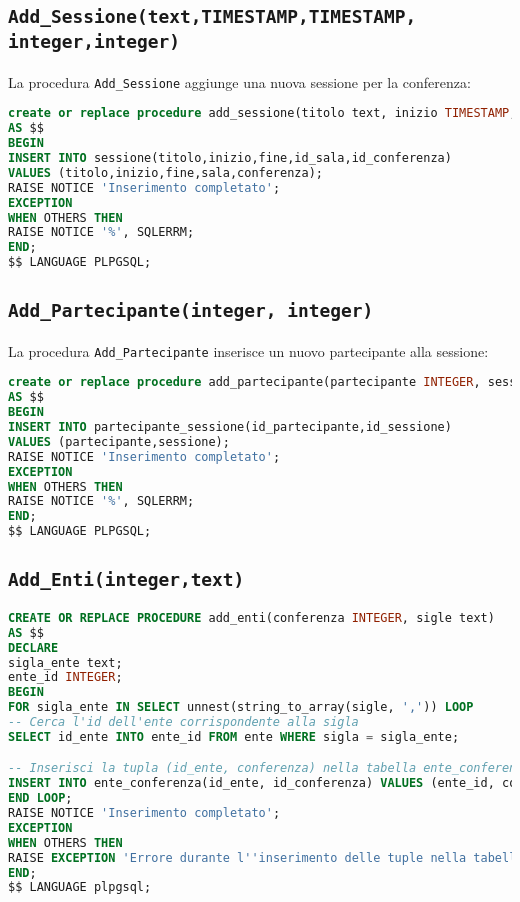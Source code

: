 \subsection{\texttt{Add\_Sessione(text,TIMESTAMP,TIMESTAMP, integer,integer)}}
La procedura \texttt{Add\_Sessione} aggiunge una nuova sessione per la conferenza:
\begin{lstlisting}[language=SQL, style=mystyle]
create or replace procedure add_sessione(titolo text, inizio TIMESTAMP, fine TIMESTAMP, sala INTEGER, conferenza INTEGER)
AS $$
BEGIN
INSERT INTO sessione(titolo,inizio,fine,id_sala,id_conferenza)
VALUES (titolo,inizio,fine,sala,conferenza);
RAISE NOTICE 'Inserimento completato';
EXCEPTION
WHEN OTHERS THEN
RAISE NOTICE '%', SQLERRM;
END;
$$ LANGUAGE PLPGSQL;
\end{lstlisting}
\subsection{\texttt{Add\_Partecipante(integer, integer)}}
La procedura \texttt{Add\_Partecipante} inserisce un nuovo partecipante alla sessione:
\begin{lstlisting}[language=SQL, style=mystyle]
create or replace procedure add_partecipante(partecipante INTEGER, sessione INTEGER)
AS $$
BEGIN
INSERT INTO partecipante_sessione(id_partecipante,id_sessione)
VALUES (partecipante,sessione);
RAISE NOTICE 'Inserimento completato';
EXCEPTION
WHEN OTHERS THEN
RAISE NOTICE '%', SQLERRM;
END;
$$ LANGUAGE PLPGSQL;
\end{lstlisting}
\subsection{\texttt{Add\_Enti(integer,text)}}
\begin{lstlisting}[language=SQL,style=mystyle]
CREATE OR REPLACE PROCEDURE add_enti(conferenza INTEGER, sigle text)
AS $$
DECLARE
sigla_ente text;
ente_id INTEGER;
BEGIN
FOR sigla_ente IN SELECT unnest(string_to_array(sigle, ',')) LOOP
-- Cerca l'id dell'ente corrispondente alla sigla
SELECT id_ente INTO ente_id FROM ente WHERE sigla = sigla_ente;

-- Inserisci la tupla (id_ente, conferenza) nella tabella ente_conferenza
INSERT INTO ente_conferenza(id_ente, id_conferenza) VALUES (ente_id, conferenza);
END LOOP;
RAISE NOTICE 'Inserimento completato';
EXCEPTION
WHEN OTHERS THEN
RAISE EXCEPTION 'Errore durante l''inserimento delle tuple nella tabella ente_conferenza: %', SQLERRM;
END;
$$ LANGUAGE plpgsql;
\end{lstlisting}
